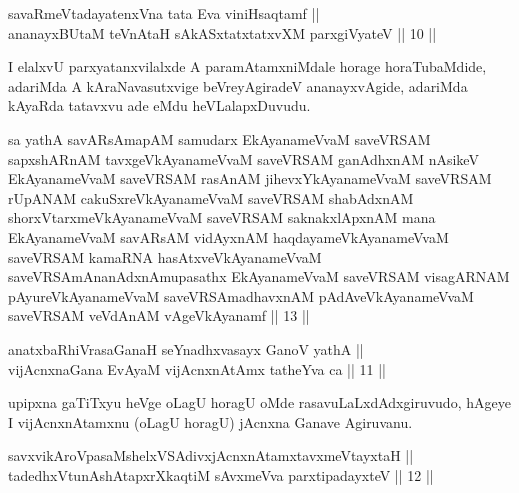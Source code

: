 
\begin{shl}
savaRmeVtadayatenxVna tata Eva viniHsaqtamf || \\
ananayxBUtaM teVnAtaH sAkASxtatxtatxvXM parxgiVyateV \hfill || 10 ||  
\end{shl}

\begin{artha}
I elalxvU parxyatanxvilalxde A paramAtamxniMdale horage horaTubaMdide, adariMda A kAraNavasutxvige beVreyAgiradeV ananayxvAgide, adariMda kAyaRda tatavxvu ade eMdu heVLalapxDuvudu.
\end{artha}


\begin{kandikeshl}
sa yathA savARsAmapAM samudarx EkAyanameVvaM saveVRSAM sapxshARnAM tavxgeVkAyanameVvaM saveVRSAM ganAdhxnAM nAsikeV EkAyanameVvaM saveVRSAM rasAnAM jihevxYkAyanameVvaM saveVRSAM rUpANAM cakuSxreVkAyanameVvaM saveVRSAM shabAdxnAM shorxVtarxmeVkAyanameVvaM saveVRSAM saknakxlApxnAM mana EkAyanameVvaM savARsAM vidAyxnAM haqdayameVkAyanameVvaM saveVRSAM kamaRNA hasAtxveVkAyanameVvaM saveVRSAmAnanAdxnAmupasathx EkAyanameVvaM saveVRSAM visagARNAM pAyureVkAyanameVvaM saveVRSAmadhavxnAM pAdAveVkAyanameVvaM saveVRSAM veVdAnAM vAgeVkAyanamf || 13 ||
\end{kandikeshl}


\begin{shl}
anatxbaRhiVrasaGanaH seYnadhxvasayx GanoV yathA || \\
vijAcnxnaGana EvAyaM vijAcnxnAtAmx tatheYva ca \hfill || 11 ||  
\end{shl}

\begin{artha}
upipxna gaTiTxyu heVge oLagU horagU oMde rasavuLaLxdAdxgiruvudo, hAgeye I vijAcnxnAtamxnu (oLagU horagU) jAcnxna Ganave Agiruvanu.
\end{artha}


\begin{shl}
savxvikAroVpasaMshelxVSAdivxjAcnxnAtamxtavxmeVtayxtaH || \\
tadedhxVtunAshAtapxrXkaqtiM sAvxmeVva parxtipadayxteV \hfill || 12 ||  
\end{shl}


